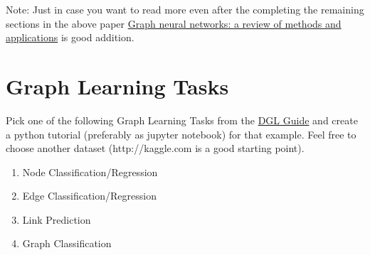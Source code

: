 \documentclass[12pt,a4paper]{article}
\begin{document}
Note: Just in case you want to read more even after the completing the remaining sections in the above paper \href{https://arxiv.org/abs/1812.08434}{Graph neural networks: a review of methods and applications} is good addition.

\section{Graph Learning Tasks}
Pick one of the following Graph Learning Tasks from the \href{https://docs.dgl.ai/guide/training.html}{DGL Guide} and create a python tutorial (preferably as jupyter  notebook) for that example. Feel free to choose another dataset (http://kaggle.com is a good starting point). 
\begin{enumerate}
   \item Node Classification/Regression
\item Edge Classification/Regression
\item Link Prediction
\item Graph Classification
\end{enumerate}
\end{document}
